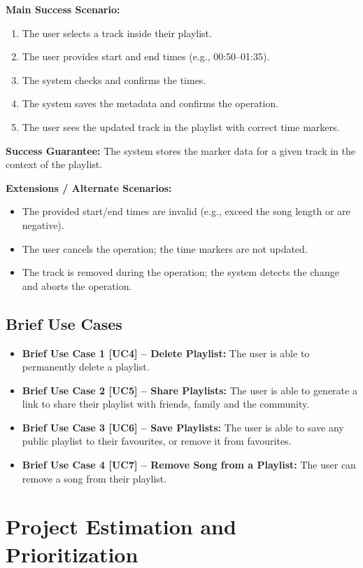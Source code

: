 \documentclass{article}
\begin{document}
\textbf{Main Success Scenario:}
\enlargethispage{\baselineskip}
\begin{enumerate}
  \item The user selects a track inside their playlist.
  \item The user provides start and end times (e.g., 00{:}50--01{:}35).
  \item The system checks and confirms the times.
  \item The system saves the metadata and confirms the operation.
  \item The user sees the updated track in the playlist with correct time markers.
\end{enumerate}

\textbf{Success Guarantee:}  
The system stores the marker data for a given track in the context of the playlist.

\textbf{Extensions / Alternate Scenarios:}
\begin{itemize}
  \item The provided start/end times are invalid (e.g., exceed the song length or are negative).
  \item The user cancels the operation; the time markers are not updated.
  \item The track is removed during the operation; the system detects the change and aborts the operation.
\end{itemize}

\subsection{Brief Use Cases}

\begin{itemize}
    \item \textbf{Brief Use Case 1 [UC4] -- Delete Playlist:} The user is able to permanently delete a playlist.
    \item \textbf{Brief Use Case 2 [UC5] -- Share Playlists:} The user is able to generate a link to share their playlist with friends, family and the community.
    \item \textbf{Brief Use Case 3 [UC6] -- Save Playlists:} The user is able to save any public playlist to their favourites, or remove it from favourites.
    \item \textbf{Brief Use Case 4 [UC7] -- Remove Song from a Playlist:} The user can remove a song from their playlist.
\end{itemize}

\section{Project Estimation and Prioritization}
\end{document}
